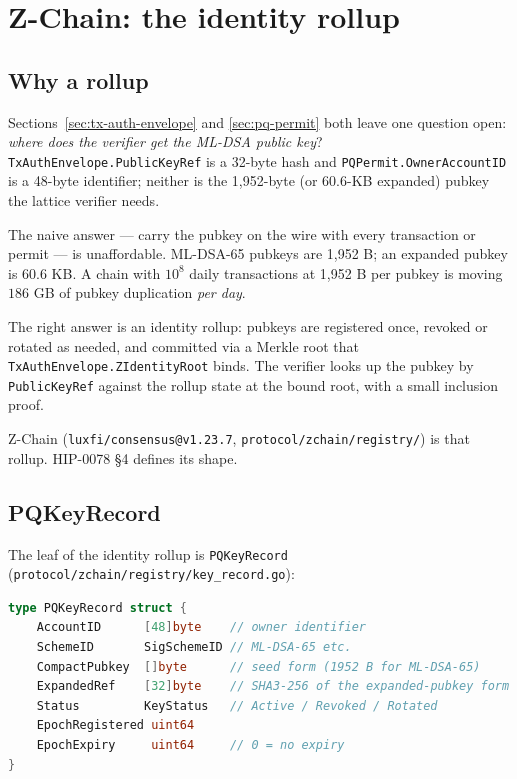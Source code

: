 \section{Z-Chain: the identity rollup}
\label{sec:zchain-rollup}

\subsection{Why a rollup}

Sections~\ref{sec:tx-auth-envelope} and \ref{sec:pq-permit} both leave one
question open: \emph{where does the verifier get the ML-DSA public key}?
\texttt{TxAuthEnvelope.PublicKeyRef} is a 32-byte hash and
\texttt{PQPermit.OwnerAccountID} is a 48-byte identifier; neither is the
1{,}952-byte (or 60.6-KB expanded) pubkey the lattice verifier needs.

The naive answer --- carry the pubkey on the wire with every transaction or
permit --- is unaffordable. ML-DSA-65 pubkeys are 1{,}952 B; an
expanded pubkey is 60.6 KB. A chain with $10^8$ daily transactions at
1{,}952 B per pubkey is moving $186$ GB of pubkey duplication \emph{per day}.

The right answer is an identity rollup: pubkeys are registered once,
revoked or rotated as needed, and committed via a Merkle root that
\texttt{TxAuthEnvelope.ZIdentityRoot} binds. The verifier looks up the
pubkey by \texttt{PublicKeyRef} against the rollup state at the bound
root, with a small inclusion proof.

Z-Chain (\texttt{luxfi/consensus@v1.23.7},
\texttt{protocol/zchain/registry/}) is that rollup. HIP-0078 §4 defines its
shape.

\subsection{PQKeyRecord}

The leaf of the identity rollup is \texttt{PQKeyRecord}
(\texttt{protocol/zchain/registry/key\_record.go}):

\begin{lstlisting}[language=Go,caption={PQKeyRecord leaf. Source:
\texttt{protocol/zchain/registry/key\_record.go}.}]
type PQKeyRecord struct {
    AccountID      [48]byte    // owner identifier
    SchemeID       SigSchemeID // ML-DSA-65 etc.
    CompactPubkey  []byte      // seed form (1952 B for ML-DSA-65)
    ExpandedRef    [32]byte    // SHA3-256 of the expanded-pubkey form
    Status         KeyStatus   // Active / Revoked / Rotated
    EpochRegistered uint64
    EpochExpiry     uint64     // 0 = no expiry
}
\end{lstlisting}

